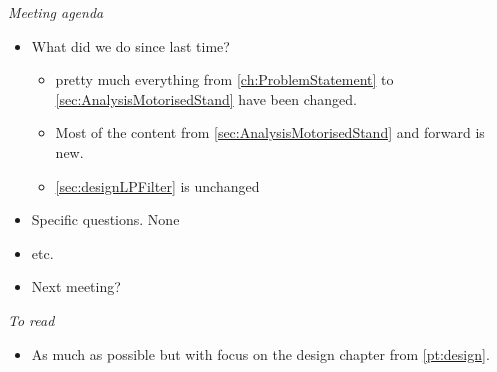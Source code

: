 \emph{Meeting agenda}
\begin{itemize}
    \item What did we do since last time?
    \begin{itemize}
    	\item pretty much everything from \autoref{ch:ProblemStatement} to \autoref{sec:AnalysisMotorisedStand} have been changed. 
    	\item Most of the content from \autoref{sec:AnalysisMotorisedStand} and forward is new. 
    	\item \autoref{sec:designLPFilter} is unchanged
	\end{itemize}
    
    \item Specific questions.
        \subitem None
    \item etc.
    \item Next meeting?
\end{itemize}


\noindent
\emph{To read}
\begin{itemize}
\item As much as possible but with focus on the design chapter from \autoref{pt:design}. 



\end{itemize}

